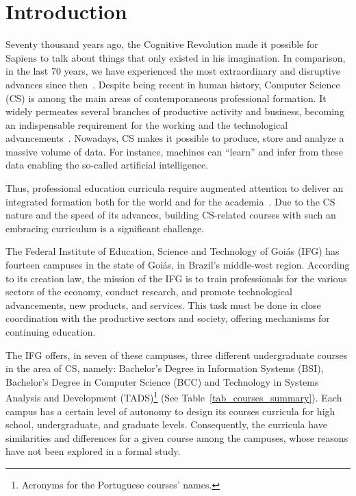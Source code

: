 \documentclass[sigconf, review]{educomp}
\begin{document}


\maketitle

\section{Introduction}\label{Introduction}
Seventy thousand years ago, the Cognitive Revolution made it possible for Sapiens to talk about things that only existed in his imagination. In comparison, in the last 70 years, we have experienced the most extraordinary and disruptive advances since then~\cite{harari2018sapiens}.
Despite being recent in human history, Computer Science (CS) is among the main areas of contemporaneous professional formation.
It widely permeates several branches of productive activity and business, becoming an indispensable requirement for the working and the technological advancements~\cite{fonseca2007historia}.
Nowadays, CS makes it possible to produce, store and analyze a massive volume of data.
For instance, machines can ``learn'' and infer from these data enabling the so-called artificial intelligence.

Thus, professional education curricula require augmented attention to deliver an integrated formation both for the world and for the academia~\cite{machado2010formaccao, moura2010relaccao, frigotto2005ensino, ciavatta2014ensino, de2016educaccao}.
Due to the CS nature and the speed of its advances, building CS-related courses with such an embracing curriculum is a significant challenge.

The Federal Institute of Education, Science and Technology of Goiás (IFG) has fourteen campuses in the state of Goiás, in Brazil's middle-west region.
According to its creation law, the mission of the IFG is to train professionals for the various sectors of the economy, conduct research, and promote technological advancements, new products, and services.
This task must be done in close coordination with the productive sectors and society, offering mechanisms for continuing education.

The IFG offers, in seven of these campuses, three different undergraduate courses in the area of CS, namely:
Bachelor's Degree in Information Systems (BSI), Bachelor's Degree in Computer Science (BCC) and Technology in Systems Analysis and Development (TADS)\footnote{Acronyms for the Portuguese courses' names.} (See Table~\ref{tab_courses_summary}).
Each campus has a certain level of autonomy to design its courses curricula for high school, undergraduate, and graduate levels.
Consequently, the curricula have similarities and differences for a given course among the campuses, whose reasons have not been explored in a formal study.
\end{document}
